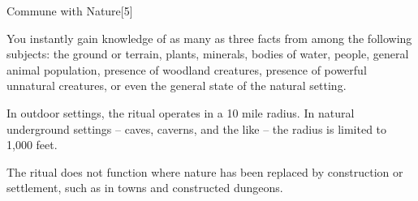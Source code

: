 \begin{spellsection}{Commune with Nature}[5]
    \begin{spellheader}
    \end{spellheader}
    \begin{spellcontent}
        \begin{spelltargetinginfo}
        \end{spelltargetinginfo}
        \begin{spelleffects}
            \spelleffect You instantly gain knowledge of as many as three facts from among the following subjects: the ground or terrain, plants, minerals, bodies of water, people, general animal population, presence of woodland creatures, presence of powerful unnatural creatures, or even the general state of the natural setting.
            \par In outdoor settings, the ritual operates in a 10 mile radius. In natural underground settings -- caves, caverns, and the like -- the radius is limited to 1,000 feet.
        \end{spelleffects}
    \end{spellcontent}
    \begin{spellfooter}
        \spellnotes The ritual does not function where nature has been replaced by construction or settlement, such as in towns and constructed dungeons.
    \end{spellfooter}
\end{spellsection}

